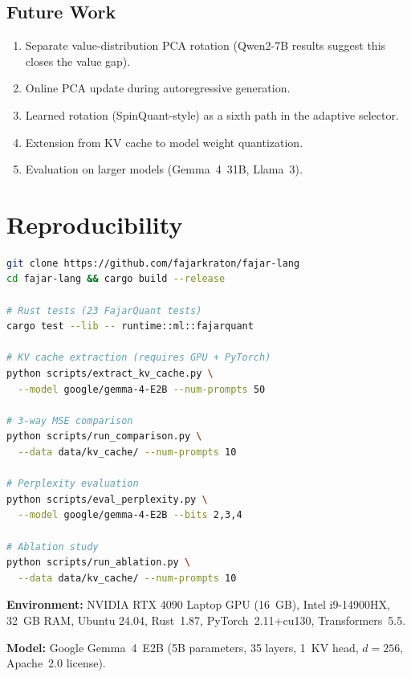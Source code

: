 \documentclass[10pt,twocolumn]{article}
\begin{document}
\subsection*{Future Work}
\begin{enumerate}[nosep]
\item Separate value-distribution PCA rotation (Qwen2-7B results suggest this closes the value gap).
\item Online PCA update during autoregressive generation.
\item Learned rotation (SpinQuant-style) as a sixth path in the adaptive selector.
\item Extension from KV cache to model weight quantization.
\item Evaluation on larger models (Gemma~4~31B, Llama~3).
\end{enumerate}

\clearpage
\appendix

\section{Reproducibility}
\label{sec:reprod}

\begin{lstlisting}[language=bash,caption={Reproducing all results}]
git clone https://github.com/fajarkraton/fajar-lang
cd fajar-lang && cargo build --release

# Rust tests (23 FajarQuant tests)
cargo test --lib -- runtime::ml::fajarquant

# KV cache extraction (requires GPU + PyTorch)
python scripts/extract_kv_cache.py \
  --model google/gemma-4-E2B --num-prompts 50

# 3-way MSE comparison
python scripts/run_comparison.py \
  --data data/kv_cache/ --num-prompts 10

# Perplexity evaluation
python scripts/eval_perplexity.py \
  --model google/gemma-4-E2B --bits 2,3,4

# Ablation study
python scripts/run_ablation.py \
  --data data/kv_cache/ --num-prompts 10
\end{lstlisting}

\textbf{Environment:} NVIDIA RTX 4090 Laptop GPU (16~GB), Intel i9-14900HX, 32~GB RAM, Ubuntu 24.04, Rust~1.87, PyTorch~2.11+cu130, Transformers~5.5.

\textbf{Model:} Google Gemma~4~E2B (5B parameters, 35 layers, 1~KV head, $d{=}256$, Apache~2.0 license).
\end{document}
